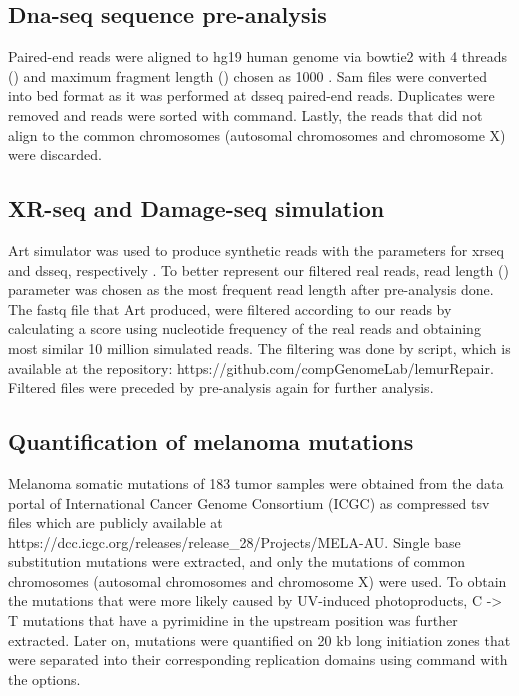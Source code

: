 \subsection{Dna-seq sequence pre-analysis}
Paired-end reads were aligned to hg19 human genome via bowtie2 with 4 threads () and maximum fragment length () chosen as 1000 \citep{langmead2012fast}. Sam files were converted into bed format as it was performed at \gls{dsseq} paired-end reads. Duplicates were removed and reads were sorted with  command. Lastly, the reads that did not align to the common chromosomes (autosomal chromosomes and chromosome X) were discarded.

\subsection{XR-seq and Damage-seq simulation}
Art simulator was used to produce synthetic reads with the parameters
 for \gls{xrseq} and \gls{dsseq}, respectively \citep{huang2012art}. To better represent our filtered real reads, read length () parameter was chosen as the most frequent read length after pre-analysis done. The fastq file that Art produced, were filtered according to our reads by calculating a score using nucleotide frequency of the real reads and obtaining most similar 10 million simulated reads. 
The filtering was done by  script, which is available at the repository: https://github.com/compGenomeLab/lemurRepair. 
Filtered files were preceded by pre-analysis again for further analysis.

\subsection{Quantification of melanoma mutations}
Melanoma somatic mutations of 183 tumor samples were obtained from the data portal of International Cancer Genome Consortium (ICGC) as compressed tsv files which are publicly available at https://dcc.icgc.org/releases/release\_28/Projects/MELA-AU. Single base substitution mutations were extracted, and only the mutations of common chromosomes (autosomal chromosomes and chromosome X) were used. To obtain the mutations that were more likely caused by UV-induced photoproducts, C -> T mutations that have a pyrimidine in the upstream position was further extracted. Later on, mutations were quantified on 20 \gls{kb} long initiation zones that were separated into their corresponding replication domains using  command with the  options.

